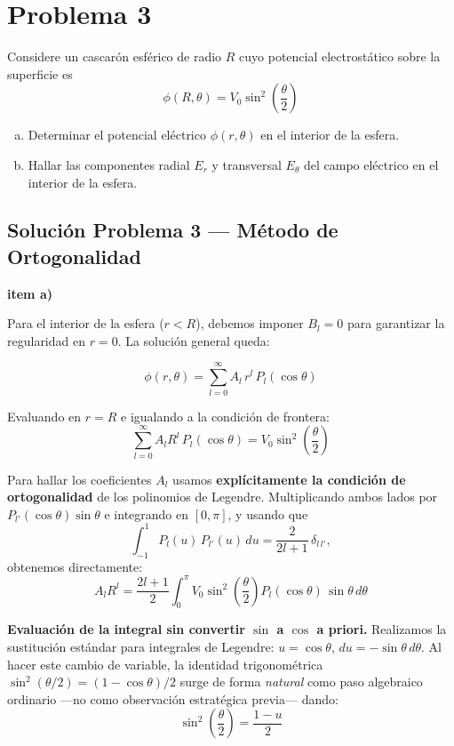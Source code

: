 \documentclass[a4paper]{article}
\begin{document}
\section{Problema 3}
Considere un cascarón esférico de radio $R$ cuyo potencial electrostático sobre la superficie es
$$\phi(R,\theta) = V_0 \sin^2\!\left(\frac{\theta}{2}\right)$$
\begin{enumerate}[a)]
\item Determinar el potencial eléctrico $\phi(r,\theta)$ en el interior de la esfera.
\item Hallar las componentes radial $E_r$ y transversal $E_\theta$ del campo eléctrico en el interior de la esfera.
\end{enumerate}

\subsection{Solución Problema 3 — Método de Ortogonalidad}

\textbf{item a)}

Para el interior de la esfera ($r < R$), debemos imponer $B_l = 0$ para garantizar la regularidad
en $r = 0$. La solución general queda:

$$\phi(r,\theta) = \sum_{l=0}^{\infty} A_l\, r^l\, P_l(\cos\theta)$$

Evaluando en $r = R$ e igualando a la condición de frontera:
$$\sum_{l=0}^{\infty} A_l R^l\, P_l(\cos\theta) = V_0 \sin^2\!\left(\frac{\theta}{2}\right)$$

Para hallar los coeficientes $A_l$ usamos \textbf{explícitamente la condición de ortogonalidad} de
los polinomios de Legendre. Multiplicando ambos lados por $P_{l'}(\cos\theta)\sin\theta$ e
integrando en $[0,\pi]$, y usando que
$$\int_{-1}^{1} P_l(u)\,P_{l'}(u)\,du = \frac{2}{2l+1}\,\delta_{l\,l'},$$
obtenemos directamente:
\begin{equation}
    A_l R^l = \frac{2l+1}{2}\int_0^{\pi} V_0\sin^2\!\left(\frac{\theta}{2}\right)
    P_l(\cos\theta)\,\sin\theta\, d\theta
    \label{eq:coef_Al}
\end{equation}

\textbf{Evaluación de la integral sin convertir $\sin$ a $\cos$ a priori.}
Realizamos la sustitución estándar para integrales de Legendre: $u = \cos\theta$,
$du = -\sin\theta\,d\theta$. Al hacer este cambio de variable, la identidad trigonométrica
$\sin^2(\theta/2) = (1-\cos\theta)/2$ surge de forma \emph{natural} como paso algebraico
ordinario —no como observación estratégica previa— dando:
$$\sin^2\!\left(\frac{\theta}{2}\right) = \frac{1-u}{2}$$
\end{document}
